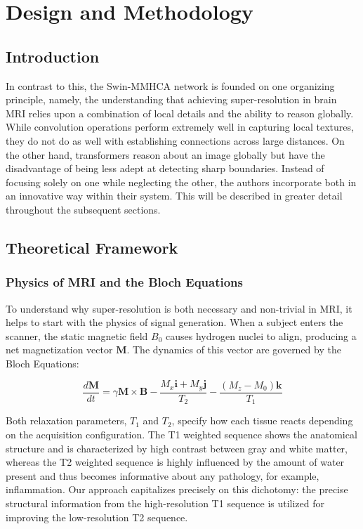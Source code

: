 \chapter{Design and Methodology}

\section{Introduction}
In contrast to this, the Swin-MMHCA network is founded on one organizing principle, namely, the understanding that achieving super-resolution in brain MRI relies upon a combination of local details and the ability to reason globally. While convolution operations perform extremely well in capturing local textures, they do not do as well with establishing connections across large distances. On the other hand, transformers reason about an image globally but have the disadvantage of being less adept at detecting sharp boundaries. Instead of focusing solely on one while neglecting the other, the authors incorporate both in an innovative way within their system. This will be described in greater detail throughout the subsequent sections.

\section{Theoretical Framework}

\subsection{Physics of MRI and the Bloch Equations}
To understand why super-resolution is both necessary and non-trivial in MRI, it helps to start with the physics of signal generation. When a subject enters the scanner, the static magnetic field $B_0$ causes hydrogen nuclei to align, producing a net magnetization vector $\mathbf{M}$. The dynamics of this vector are governed by the Bloch Equations:

\begin{equation}
    \frac{d\mathbf{M}}{dt} = \gamma \mathbf{M} \times \mathbf{B} - \frac{M_x \mathbf{i} + M_y \mathbf{j}}{T_2} - \frac{(M_z - M_0) \mathbf{k}}{T_1}
\end{equation}

Both relaxation parameters, $T_1$ and $T_2$, specify how each tissue reacts depending on the acquisition configuration. The T1 weighted sequence shows the anatomical structure and is characterized by high contrast between gray and white matter, whereas the T2 weighted sequence is highly influenced by the amount of water present and thus becomes informative about any pathology, for example, inflammation. Our approach capitalizes precisely on this dichotomy: the precise structural information from the high-resolution T1 sequence is utilized for improving the low-resolution T2 sequence.

